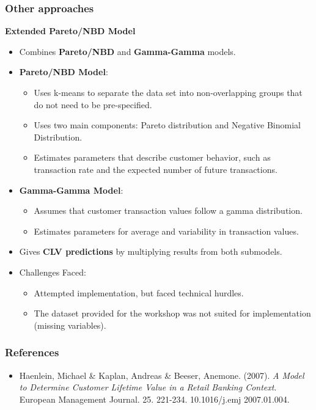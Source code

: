 \documentclass[aspectratio=169,xcolor=x11names,compress]{beamer}
\begin{document}
\begin{frame}
\frametitle{Other approaches}

\textbf{Extended Pareto/NBD Model}

\begin{itemize}
  \item Combines \textbf{Pareto/NBD} and \textbf{Gamma-Gamma} models.
  
  \item \textbf{Pareto/NBD Model}:
  \begin{itemize}
    \item Uses k-means to separate the data set into non-overlapping groups that do not need to be pre-specified.
    \item Uses two main components: Pareto distribution and Negative Binomial Distribution.
    \item Estimates parameters that describe customer behavior, such as transaction rate and the expected number of future transactions.
  \end{itemize}
  
  \item \textbf{Gamma-Gamma Model}:
  \begin{itemize}
    \item Assumes that customer transaction values follow a gamma distribution.
    \item Estimates parameters for average and variability in transaction values.
  \end{itemize}
  
  \item Gives \textbf{CLV predictions} by multiplying results from both submodels.
  
  \item Challenges Faced:
  \begin{itemize}
    \item Attempted implementation, but faced technical hurdles.
    \item The dataset provided for the workshop was not suited for implementation (missing variables).
  \end{itemize}
\end{itemize}

\end{frame}

\begin{frame}
\frametitle{References}

\begin{itemize}
	\item Haenlein, Michael \& Kaplan, Andreas \& Beeser, Anemone. (2007). \textit{A Model to Determine Customer Lifetime Value in a Retail Banking Context}. European Management Journal. 25. 221-234. 10.1016/j.emj 2007.01.004. 
\end{itemize}

\end{frame}
\end{document}
